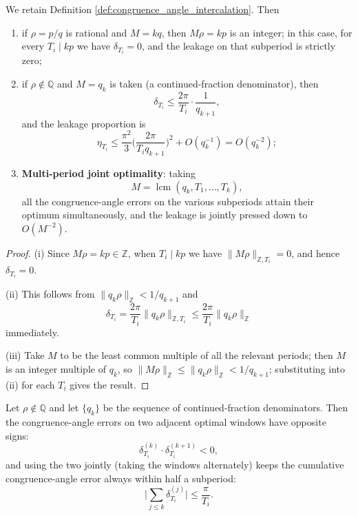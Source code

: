 \begin{theorem}\label{thm:congruence_angle_intercalation_optimal}
We retain Definition \ref{def:congruence_angle_intercalation}. Then
\begin{enumerate}[label=(\roman*)]
    \item if $\rho=p/q$ is rational and $M=kq$, then $M\rho=kp$ is an integer; in this case, for every $T_i\mid kp$ we have $\delta_{T_i}=0$, and the leakage on that subperiod is strictly zero;
    \item if $\rho\notin\mathbb{Q}$ and $M=q_k$ is taken (a continued-fraction denominator), then
    \[
    \delta_{T_i}\le\frac{2\pi}{T_i}\cdot\frac{1}{q_{k+1}},
    \]
    and the leakage proportion is
    \[
    \eta_{T_i}\le\frac{\pi^2}{3}\Big(\frac{2\pi}{T_i q_{k+1}}\Big)^2+O(q_k^{-1})=O(q_k^{-2});
    \]
    \item \textbf{Multi-period joint optimality}: taking
    \[
    M=\operatorname{lcm}(q_k,T_1,\dots,T_k),
    \]
    all the congruence-angle errors on the various subperiods attain their optimum simultaneously, and the leakage is jointly pressed down to $O(M^{-2})$.
\end{enumerate}
\end{theorem}

\begin{proof}
(i) Since $M\rho=kp\in\mathbb{Z}$, when $T_i\mid kp$ we have $\|M\rho\|_{\mathbb{Z},T_i}=0$, and hence $\delta_{T_i}=0$.

(ii) This follows from $\|q_k\rho\|_{\mathbb{Z}}<1/q_{k+1}$ and
\[
\delta_{T_i}=\frac{2\pi}{T_i}\|q_k\rho\|_{\mathbb{Z},T_i}
\le\frac{2\pi}{T_i}\|q_k\rho\|_{\mathbb{Z}}
\]
immediately.

(iii) Take $M$ to be the least common multiple of all the relevant periods; then $M$ is an integer multiple of $q_k$, so $\|M\rho\|_{\mathbb{Z}}\le\|q_k\rho\|_{\mathbb{Z}}<1/q_{k+1}$; substituting into (ii) for each $T_i$ gives the result.
\end{proof}

\begin{proposition}\label{prop:congruence_angle_sandwich}
Let $\rho\notin\mathbb{Q}$ and let $\{q_k\}$ be the sequence of continued-fraction denominators. Then the congruence-angle errors on two adjacent optimal windows have opposite signs:
\[
\delta_{T_i}^{(k)}\cdot\delta_{T_i}^{(k+1)}<0,
\]
and using the two jointly (taking the windows alternately) keeps the cumulative congruence-angle error always within half a subperiod:
\[
\Big|\sum_{j\le k}\delta_{T_i}^{(j)}\Big|\le\frac{\pi}{T_i}.
\]
\end{proposition}

